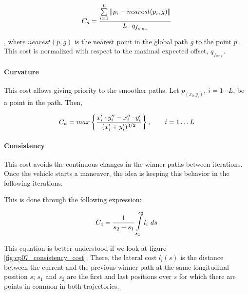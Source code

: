 \begin{equation}\label{eq:cp07_lateral_cost}
C_d = {{\sum\limits_{i=1}^{L}\|p_i - nearest(p_i, g)\|} \over {L \cdot q_{f_{max}}}}
\end{equation}

, where $nearest(p, g)$ is the nearest point in the global path $g$ to the point $p$. This cost is normalized with respect to the maximal expected offset, $q_{f_{max}}$.

\paragraph{Curvature}\label{ch:chapter07_01_04_00_04}

This cost allows giving priority to the smoother paths. Let $p_(x_i, y_i), ~ i=1\cdots L$, be a point in the path. Then, 

\begin{equation}\label{eq:cp07_curvature_cost}
C_{\kappa} = max \left \{ {{x_i' \cdot y_i'' - x_i'' \cdot y_i'} \over {(x_i' + y_i')^{3/2}}} \right \}, ~~~~~~ i=1 \dots L
\end{equation}

\paragraph{Consistency}\label{ch:chapter07_01_04_00_05}

This cost avoids the continuous changes in the winner paths between iterations. Once the vehicle starts a maneuver, the idea is keeping this behavior in the following iterations.

This is done through the following expression:

\begin{equation}\label{eq:cp07_consistency_cost}
C_c = {1 \over {s_2 - s_1}} \int \limits_{s_1}^{s_2} l_i ~ ds
\end{equation}

This equation is better understood if we look at figure \ref{fig:cp07_consistency_cost}. There, the lateral cost $l_i(s)$ is the distance between the current and the previous winner path at the same longitudinal position $s$; $s_1$ and $s_2$ are the first and last positions over $s$ for which there are points in common in both trajectories.

